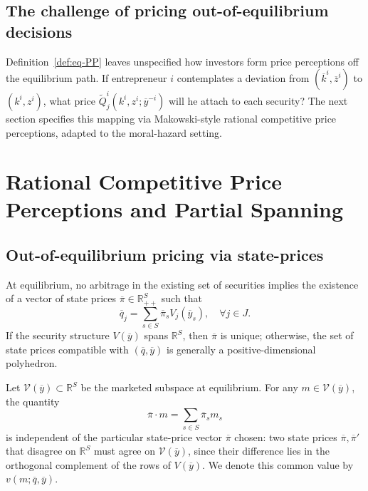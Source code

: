 \documentclass[11pt,a4paper,oneside]{book}
\def\R{\mathbb{R}}
\theoremstyle{plain}
\theoremstyle{definition}
\theoremstyle{remark}
\numberwithin{equation}{chapter}
\begin{document}
\subsection{The challenge of pricing out-of-equilibrium decisions}

Definition~\ref{def:eq-PP} leaves unspecified how investors form price perceptions off the equilibrium path.
If entrepreneur $i$ contemplates a deviation from $(\overline{k}^i, \overline{z}^i)$ to $(k^i, z^i)$, what price $\widetilde{Q}^i_j(k^i, z^i; \overline{y}^{-i})$ will he attach to each security?
The next section specifies this mapping via Makowski-style rational competitive price perceptions, adapted to the moral-hazard setting.

\section{Rational Competitive Price Perceptions and Partial Spanning}
\label{sec:RCPP}

\subsection{Out-of-equilibrium pricing via state-prices}

At equilibrium, no arbitrage in the existing set of securities implies the existence of a vector of state prices $\overline{\pi} \in \R_{++}^S$ such that
\begin{equation}\label{eq:state-prices}
  \overline{q}_j = \sum_{s \in S} \overline{\pi}_s V_j(\overline{y}_s),
  \quad \forall j \in J.
\end{equation}
If the security structure $V(\overline{y})$ spans $\R^S$, then $\overline{\pi}$ is unique; otherwise, the set of state prices compatible with $(\overline{q}, \overline{y})$ is generally a positive-dimensional polyhedron.

Let $\mathcal{V}(\overline{y}) \subset \R^S$ be the marketed subspace at equilibrium.
For any $m \in \mathcal{V}(\overline{y})$, the quantity
\begin{equation*}
  \overline{\pi} \cdot m = \sum_{s \in S} \overline{\pi}_s m_s
\end{equation*}
is independent of the particular state-price vector $\overline{\pi}$ chosen: two state prices $\overline{\pi}, \overline{\pi}'$ that disagree on $\R^S$ must agree on $\mathcal{V}(\overline{y})$, since their difference lies in the orthogonal complement of the rows of $V(\overline{y})$.
We denote this common value by $v(m; \overline{q}, \overline{y})$.
\end{document}
